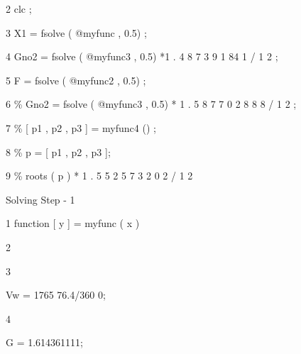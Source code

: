 \documentclass[a4paper,portrait,12pt]{article}
\begin{document}
\begin{flushleft}
2 clc ;
\end{flushleft}


\begin{flushleft}
3 X1 = fsolve ( @myfunc , 0.5) ;
\end{flushleft}


\begin{flushleft}
4 Gno2 = fsolve ( @myfunc3 , 0.5) *1 . 4 8 7 3 9 1 84 1 / 1 2 ;
\end{flushleft}


\begin{flushleft}
5 F = fsolve ( @myfunc2 , 0.5) ;
\end{flushleft}


\begin{flushleft}
6 \% Gno2 = fsolve ( @myfunc3 , 0.5) * 1 . 5 8 7 7 0 2 8 8 8 / 1 2 ;
\end{flushleft}


\begin{flushleft}
7 \% [ p1 , p2 , p3 ] = myfunc4 () ;
\end{flushleft}


\begin{flushleft}
8 \% p = [ p1 , p2 , p3 ];
\end{flushleft}


\begin{flushleft}
9 \% roots ( p ) * 1 . 5 5 2 5 7 3 2 0 2 / 1 2
\end{flushleft}





\begin{flushleft}
Solving Step - 1
\end{flushleft}


\begin{flushleft}
1 function [ y ] = myfunc ( x )
\end{flushleft}


2


3





\begin{flushleft}
Vw = 1765 76.4/360 0;
\end{flushleft}





4





\begin{flushleft}
G = 1.614361111;
\end{flushleft}
\end{document}
